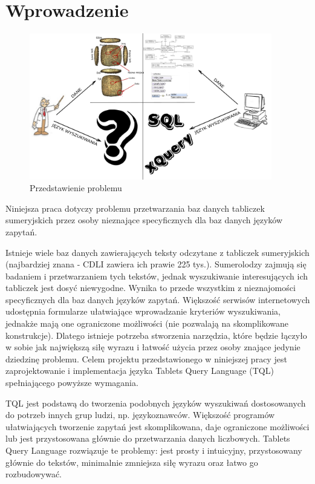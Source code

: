 \chapter*{Wprowadzenie}
\begin{figure}[h]
 \centering
 \includegraphics[width=400px]{../diagramy/poco.pdf}
 \caption{Przedstawienie problemu}
 \label{fig:poco}
\end{figure}

 
 
Niniejsza praca dotyczy problemu przetwarzania baz danych tabliczek sumeryjskich przez osoby nieznające specyficznych dla baz danych języków zapytań.


Istnieje wiele baz danych zawierających teksty odczytane z tabliczek sumeryjskich (najbardziej znana - CDLI zawiera ich prawie 225 tys.). Sumerolodzy zajmują się badaniem i przetwarzaniem tych tekstów, jednak wyszukiwanie interesujących ich tabliczek jest dosyć niewygodne. Wynika to przede wszystkim z nieznajomości specyficznych dla baz danych języków zapytań. 
Większość serwisów internetowych udostępnia formularze ułatwiające wprowadzanie kryteriów wyszukiwania, jednakże mają one ograniczone możliwości (nie pozwalają na skomplikowane konstrukcje). Dlatego istnieje potrzeba stworzenia narzędzia, które będzie łączyło w sobie jak największą siłę wyrazu i łatwość użycia przez osoby znające jedynie dziedzinę problemu. Celem projektu przedstawionego w niniejszej pracy jest zaprojektowanie i implementacja języka Tablets Query Language (TQL) spełniającego powyższe wymagania. 

TQL jest podstawą do tworzenia podobnych języków wyszukiwań dostosowanych do potrzeb innych grup ludzi, np. językoznawców.
Większość programów ułatwiających tworzenie zapytań jest skomplikowana, daje ograniczone możliwości lub jest przystosowana głównie do przetwarzania danych liczbowych. Tablets Query Language rozwiązuje te problemy: jest prosty i intuicyjny, przystosowany głównie do tekstów, minimalnie zmniejsza siłę wyrazu oraz łatwo go rozbudowywać. 

